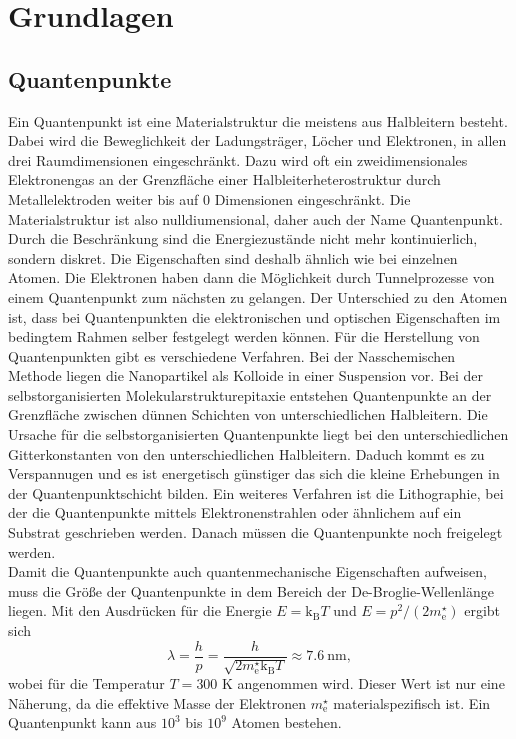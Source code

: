\section{Grundlagen}\label{sec:Grundlagen}
\subsection{Quantenpunkte}
Ein Quantenpunkt \cite{quantum_dot} ist eine Materialstruktur die meistens aus Halbleitern besteht. Dabei wird die Beweglichkeit der Ladungsträger, Löcher und Elektronen, in allen drei Raumdimensionen eingeschränkt. 
Dazu wird oft ein zweidimensionales Elektronengas an der Grenzfläche einer Halbleiterheterostruktur durch Metallelektroden weiter bis auf 0 Dimensionen eingeschränkt.
Die Materialstruktur ist also nulldiumensional, daher auch der Name Quantenpunkt.  Durch die Beschränkung sind die Energiezustände nicht mehr kontinuierlich, sondern diskret. Die Eigenschaften sind deshalb ähnlich wie bei einzelnen Atomen. 
Die Elektronen haben dann die Möglichkeit durch Tunnelprozesse von einem Quantenpunkt zum nächsten zu gelangen. 
Der Unterschied zu den Atomen ist, dass bei Quantenpunkten die elektronischen und optischen Eigenschaften im bedingtem Rahmen  selber festgelegt werden können. 
Für die Herstellung von Quantenpunkten gibt es verschiedene Verfahren. Bei der Nasschemischen Methode liegen die Nanopartikel als Kolloide in einer Suspension vor. Bei der selbstorganisierten Molekularstrukturepitaxie entstehen Quantenpunkte an der Grenzfläche zwischen dünnen Schichten von unterschiedlichen Halbleitern. Die Ursache für die selbstorganisierten Quantenpunkte liegt bei den unterschiedlichen Gitterkonstanten von den unterschiedlichen Halbleitern. Daduch kommt es zu Verspannugen und es ist energetisch günstiger das sich die  kleine Erhebungen in der Quantenpunktschicht bilden. Ein weiteres Verfahren ist die Lithographie, bei der die Quantenpunkte mittels Elektronenstrahlen oder ähnlichem auf ein Substrat   \glqq geschrieben\grqq{} werden. Danach müssen die Quantenpunkte noch \glqq freigelegt\grqq{} werden. \\
Damit die Quantenpunkte auch quantenmechanische Eigenschaften aufweisen, muss die Grö{\ss}e der Quantenpunkte in dem Bereich der De-Broglie-Wellenlänge liegen.  Mit den Ausdrücken für die Energie $ E = \mathrm{k}_{\mathrm{B}} T$ und $ E = p^2/(2m_{\mathrm{e}}^\star)$ ergibt sich
\begin{equation}
\lambda = \frac{h}{p} = \frac{h}{\sqrt{2m_{\mathrm{e}}^\star \mathrm{k}_{\mathrm{B}} T}} \approx 7.6\ \mathrm{nm},
\end{equation}
 wobei für die Temperatur $T=300$ K angenommen wird. Dieser Wert ist nur eine Näherung, da die effektive Masse der Elektronen $m_{\mathrm{e}}^\star$ materialspezifisch ist. Ein Quantenpunkt kann aus $10^3$ bis $10^9$ Atomen bestehen. \\
 
